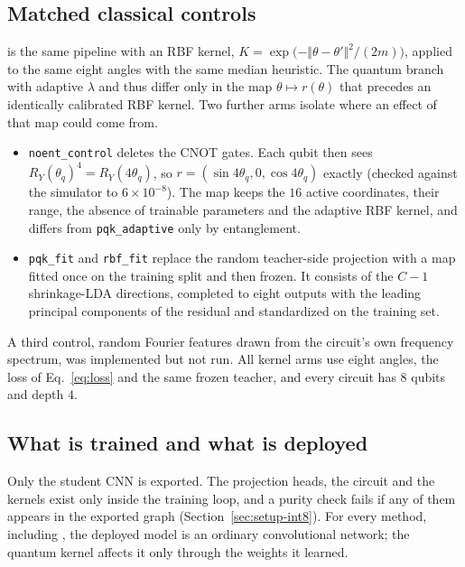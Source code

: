 \subsection{Matched classical controls}
\label{sec:controls}

\Rbf is the same pipeline with an RBF kernel, $K=\exp\!\big(-\Vert\theta-\theta'\Vert^{2}/(2m)\big)$, applied to the same eight angles with the same median heuristic.
The quantum branch with adaptive $\lambda$ and \Rbf thus differ only in the map $\theta\mapsto r(\theta)$ that precedes an identically calibrated RBF kernel.
Two further arms isolate where an effect of that map could come from.
\begin{itemize}
  \item \texttt{noent\_control} deletes the CNOT gates. Each qubit then sees $R_Y(\theta_q)^{4}=R_Y(4\theta_q)$, so $r=(\sin4\theta_q,0,\cos4\theta_q)$ exactly (checked against the simulator to $6\times10^{-8}$). The map keeps the $16$ active coordinates, their range, the absence of trainable parameters and the adaptive RBF kernel, and differs from \texttt{pqk\_adaptive} only by entanglement.
  \item \texttt{pqk\_fit} and \texttt{rbf\_fit} replace the random teacher-side projection with a map fitted once on the training split and then frozen. It consists of the $C{-}1$ shrinkage-LDA directions, completed to eight outputs with the leading principal components of the residual and standardized on the training set.
\end{itemize}
A third control, random Fourier features drawn from the circuit's own frequency spectrum, was implemented but not run.
All kernel arms use eight angles, the loss of Eq.~\eqref{eq:loss} and the same frozen teacher, and every circuit has $8$ qubits and depth $4$.

\subsection{What is trained and what is deployed}
\label{sec:deployed}

Only the student CNN is exported.
The projection heads, the circuit and the kernels exist only inside the training loop, and a purity check fails if any of them appears in the exported graph (Section~\ref{sec:setup-int8}).
For every method, including \Pqk, the deployed model is an ordinary convolutional network; the quantum kernel affects it only through the weights it learned.
